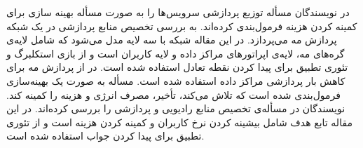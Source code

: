     در \cite{barcelo2016iot} نویسندگان مسأله توزیع پردازشی سرویس‌ها‌ را به صورت مسأله بهینه سازی برای کمینه کردن هزینه فرمول‌بندی کرده‌اند.
    \cite{zhang2017computing} به بررسی تخصیص منابع پردازشی در یک شبکه پردازش مه می‌پردازد.
    در این مقاله شبکه با سه لایه مدل می‌شود که شامل لایه‌ی گره‌های مه، لایه‌ی اپراتور‌های مراکز داده و لایه کاربران است و از بازی استکلبرگ و تئوری تطبیق برای پیدا کردن نقطه تعادل استفاده شده است.
    در \cite{liu2017multiobjective} از پردازش مه برای کاهش بار پردازشی مراکز داده استفاده شده است.
    مسأله به صورت یک بهینه‌سازی فرمول‌بندی شده است که تلاش می‌کند، تأخیر، مصرف انرژی و هزینه را کمینه کند.
    نویسندگان در \cite{gu2018joint} مسأله‌ی تخصیص منابع رادیویی و پردازشی را بررسی کرده‌اند.
    در این مقاله تابع هدف شامل بیشینه کردن نرخ کاربران و کمینه کردن هزینه است و از تئوری تطبیق برای پیدا کردن جواب استفاده شده است.